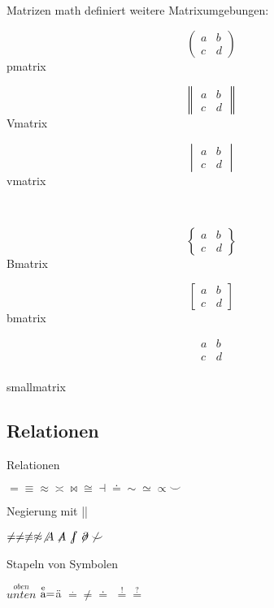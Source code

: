 \documentclass[
	vorläufig=false,
	datum=2022-11-09,
	titel={Mathematiksatz},
	web=false,
	max,
	aspectratio=1610,
]{../tex/latexkurs-slides}
\begin{document}
\begin{frame}[fragile]{Matrizen}
\AmS math definiert weitere Matrixumgebungen:\\[2em]
\begin{minipage}{3cm}
\[\begin{pmatrix}
a & b \\ c & d
\end{pmatrix}\]
\centering pmatrix
\end{minipage}
\begin{minipage}{3cm}
\[\begin{Vmatrix}
a & b \\ c & d
\end{Vmatrix}\]
\centering Vmatrix
\end{minipage}
\begin{minipage}{3cm}
\[\begin{vmatrix}
a & b \\ c & d
\end{vmatrix}\]
\centering vmatrix
\end{minipage}
\\[2em]
\begin{minipage}{3cm}
\[\begin{Bmatrix}
a & b \\ c & d
\end{Bmatrix}\]
\centering Bmatrix
\end{minipage}
\begin{minipage}{3cm}
\[\begin{bmatrix}
a & b \\ c & d
\end{bmatrix}\]
\centering bmatrix
\end{minipage}
\begin{minipage}{3cm}
\[\begin{smallmatrix}
a & b \\ c & d
\end{smallmatrix}\]\\
\centering smallmatrix
\end{minipage}
\end{frame}

\subsection{Relationen}
\begin{frame}[fragile]{Relationen}
\begin{LTXexample}
\(= \equiv \approx \asymp \bowtie \cong \dashv \doteq \sim \simeq \propto \smile\)
\end{LTXexample}
\pause Negierung mit |\not|

\begin{LTXexample} 
\(\not = \neq \not\equiv
\not \approx \not A \not\kern-.25em A
\not\kern-.2em\int \not\kern-.2em\partial \not \smile\)
\end{LTXexample}
\pause Stapeln von Symbolen

\begin{LTXexample}
\(\stackrel{oben}{unten}\)
\(\stackrel{\text e}{\text a}=\)ä
\(\stackrel . = \neq \doteq\)
\(\stackrel != \stackrel ?=\)
\end{LTXexample}
\end{frame}
\end{document}
